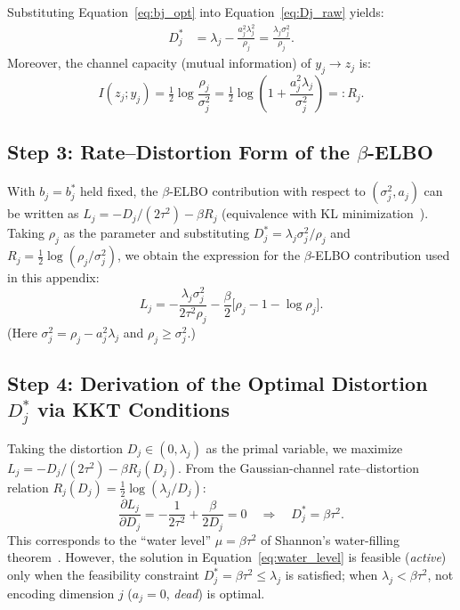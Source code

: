 \documentclass[make,article,submit,pdftex,moreauthors]{Definitions/mdpi}
\begin{document}
Substituting Equation~\eqref{eq:bj_opt} into Equation~\eqref{eq:Dj_raw} yields:
\begin{align}
  D_j^* &= \lambda_j - \frac{a_j^2 \lambda_j^2}{\rho_j}
          = \frac{\lambda_j \sigma_j^2}{\rho_j}.
  \label{eq:Dj_opt}
\end{align}
Moreover, the channel capacity (mutual information) of $y_j \to z_j$ is:
\begin{equation}
  I(z_j; y_j) = \tfrac{1}{2}\log\frac{\rho_j}{\sigma_j^2}
              = \tfrac{1}{2}\log\!\left(1 + \frac{a_j^2 \lambda_j}{\sigma_j^2}\right)
              =: R_j.
  \label{eq:Rj}
\end{equation}

\subsection*{Step 3: Rate--Distortion Form of the $\beta$-ELBO}

With $b_j = b_j^*$ held fixed, the $\beta$-ELBO contribution with respect to
$(\sigma_j^2, a_j)$ can be written as
$L_j = -D_j/(2\tau^2) - \beta R_j$ (equivalence with KL
minimization~\cite{cover2006elements}).
Taking $\rho_j$ as the parameter and substituting
$D_j^* = \lambda_j \sigma_j^2/\rho_j$ and
$R_j = \tfrac{1}{2}\log(\rho_j/\sigma_j^2)$,
we obtain the expression for the $\beta$-ELBO contribution used in this appendix:
\begin{equation}
  L_j = -\frac{\lambda_j \sigma_j^2}{2\tau^2 \rho_j}
        - \frac{\beta}{2}\bigl[\rho_j - 1 - \log \rho_j\bigr].
  \label{eq:elbo_j}
\end{equation}
(Here $\sigma_j^2 = \rho_j - a_j^2\lambda_j$ and $\rho_j \geq \sigma_j^2$.)

\subsection*{Step 4: Derivation of the Optimal Distortion $D_j^*$ via KKT Conditions}

Taking the distortion $D_j \in (0, \lambda_j)$ as the primal variable, we maximize
$L_j = -D_j/(2\tau^2) - \beta R_j(D_j)$.
From the Gaussian-channel rate--distortion relation
$R_j(D_j) = \tfrac{1}{2}\log(\lambda_j / D_j)$:
\begin{equation}
  \frac{\partial L_j}{\partial D_j}
  = -\frac{1}{2\tau^2} + \frac{\beta}{2 D_j} = 0
  \quad\Longrightarrow\quad
  D_j^{*} = \beta \tau^2.
  \label{eq:water_level}
\end{equation}
This corresponds to the ``water level'' $\mu = \beta\tau^2$ of Shannon's
water-filling theorem~\cite{cover2006elements}.
However, the solution in Equation~\eqref{eq:water_level} is feasible
(\textit{active}) only when the feasibility constraint
$D_j^* = \beta\tau^2 \leq \lambda_j$ is satisfied; when
$\lambda_j < \beta\tau^2$, not encoding dimension $j$
($a_j = 0$, \textit{dead}) is optimal.
\end{document}
